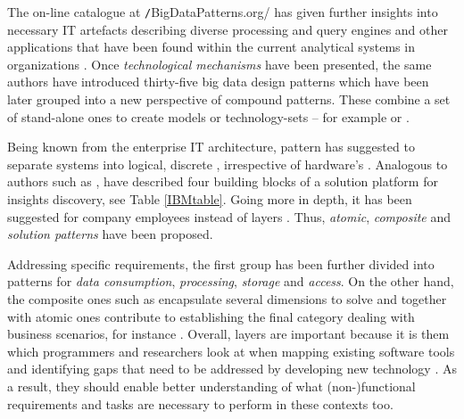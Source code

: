 The on-line catalogue at \texttt/BigDataPatterns.org/ has given further insights into necessary \ac{IT} artefacts describing diverse processing and query engines and other applications that have been found within the current analytical systems in organizations \parencites{Arcitura2017BiDataPatterns}{erl2015big}.
Once \emph{technological mechanisms} have been presented, the same authors have introduced thirty-five big data design patterns which have been later grouped into a new perspective of compound patterns. 
These combine a set of stand-alone ones to create models or technology-sets -- for example  or .

Being known from the enterprise \ac{IT} architecture,  pattern has suggested to separate systems into logical, discrete , irrespective of hardware's  \parencite{MicrosoftPatterns2017}.
Analogous to authors such as \textcites{Hossam2017}{Lara2015BigData}, \textcite{IBM2013DeveloperWorks} have described four building blocks of a solution platform for insights discovery, see Table \ref{IBMtable}.
Going more in depth, it has been suggested for company employees  instead of layers \parencite{IBM2013DeveloperWorks}.
Thus, \emph{atomic}, \emph{composite} and \emph{solution patterns} have been proposed. 

Addressing specific requirements, the first group has been further divided into patterns for \emph{data consumption}, \emph{processing}, \emph{storage} and \emph{access}.
On the other hand, the composite ones such as  encapsulate several dimensions to solve  and together with atomic ones contribute to establishing the final category dealing with business scenarios, for instance  \parencite{IBM2013DeveloperWorks}. 
Overall, layers are important because it is them which programmers and researchers look at when mapping existing software tools and identifying gaps that need to be addressed by developing new technology \parencites{Fowler2002}{IBM2013DeveloperWorks}. 
As a result, they should enable better understanding of what (non-)functional requirements and tasks are necessary to perform in these contexts too.

